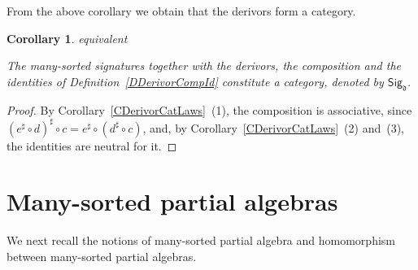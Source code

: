 \documentclass[a4paper, reqno]{amsbook}
\makeatletter
\theoremstyle{plain}
\newtheorem{corollary}[theorem]{Corollary}
\theoremstyle{definition}
\newcommand*{\CA@leanpending}{}
\newcommand*{\CA@leanrelation}{}
\newcommand*{\lean}[2]{%
  \ifcsname\string\color@lean@#1\endcsname\else
    \PackageError{main}{Unknown relation `#1' in \string\lean}{Use equivalent, weaker or stronger.}%
  \fi
  \gdef\CA@leanrelation{#1}%
  \gdef\CA@leanpending{#2}}
\makeatother
\begin{document}
From the above corollary we obtain that the derivors form a category.

\begin{corollary}\label{CSigdCat}\lean{equivalent}{instCategoryManySortedSignature}
The many-sorted signatures together with the derivors, the composition and the identities of Definition~\ref{DDerivorCompId} constitute a category, denoted by $\mathsf{Sig}_{\mathfrak{d}}$.
\end{corollary}
\begin{proof}
By Corollary~\ref{CDerivorCatLaws}~(1), the composition is associative, since $(e^{\sharp}\circ d)^{\sharp}\circ c=e^{\sharp}\circ(d^{\sharp}\circ c)$, and, by Corollary~\ref{CDerivorCatLaws}~(2) and~(3), the identities are neutral for it.
\end{proof}

\section{Many-sorted partial algebras}\label{SManySortedPartialAlg}

We next recall the notions of many-sorted partial algebra and homomorphism between many-sorted partial algebras.
\end{document}
